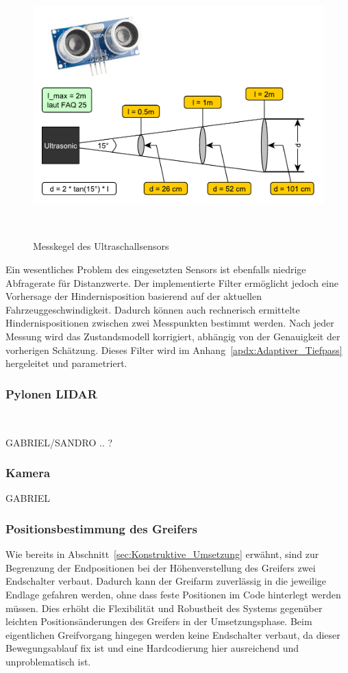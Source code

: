 \documentclass[main.tex]{subfiles} %
\begin{document}
\begin{figure}[H]
    \centering
    \includegraphics[width = 0.5\linewidth]{./fig_Antriebsregelung_Firmware/Auslesegenauigkeit_Ultraschall.pdf}
    \caption{Messkegel des Ultraschallsensors}~\label{fig:HcSr04_Messkegel}
\end{figure}

Ein wesentliches Problem des eingesetzten Sensors ist ebenfalls niedrige
Abfragerate für Distanzwerte. Der implementierte Filter ermöglicht jedoch eine
Vorhersage der Hindernisposition basierend auf der aktuellen
Fahrzeuggeschwindigkeit. Dadurch können auch rechnerisch ermittelte
Hindernispositionen zwischen zwei Messpunkten bestimmt werden. Nach jeder
Messung wird das Zustandsmodell korrigiert, abhängig von der Genauigkeit der
vorherigen Schätzung. Dieses Filter wird im
Anhang~\ref{apdx:Adaptiver_Tiefpass} hergeleitet und parametriert.


\subsubsection*{Pylonen LIDAR}~\label{sec:Sensorik_Lidar}

GABRIEL/SANDRO .. ?

\subsubsection*{Kamera}

GABRIEL

\subsubsection*{Positionsbestimmung des Greifers}
Wie bereits in Abschnitt~\ref{sec:Konstruktive_Umsetzung} erwähnt, sind zur Begrenzung der Endpositionen bei der
Höhenverstellung des Greifers zwei Endschalter verbaut. Dadurch kann der Greifarm zuverlässig in die jeweilige Endlage
gefahren werden, ohne dass feste Positionen im Code hinterlegt werden müssen. Dies erhöht die Flexibilität und Robustheit
des Systems gegenüber leichten Positionsänderungen des Greifers in der Umsetzungsphase. Beim eigentlichen Greifvorgang hingegen werden keine Endschalter
verbaut, da dieser Bewegungsablauf fix ist und eine Hardcodierung hier ausreichend und unproblematisch ist.
\end{document}
